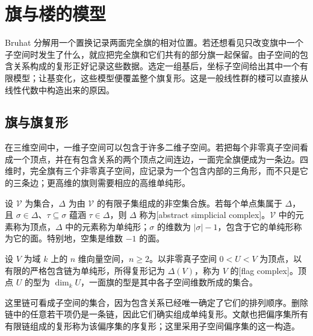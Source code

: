 
\section{旗与楼的模型}
\label{b5:sec:F03}

Bruhat 分解用一个置换记录两面完全旗的相对位置。若还想看见只改变旗中一个子空间时发生了什么，就应把完全旗和它们共有的部分旗一起保留。由子空间的包含关系构成的复形正好记录这些数据。选定一组基后，坐标子空间给出其中一个有限模型；让基变化，这些模型便覆盖整个旗复形。这是一般线性群的楼可以直接从线性代数中构造出来的原因。

\subsection{旗与旗复形}
\label{b5:subsec:F03:01}

在三维空间中，一维子空间可以包含于许多二维子空间。若把每个非零真子空间看成一个顶点，并在有包含关系的两个顶点之间连边，一面完全旗便成为一条边。四维时，完全旗有三个非零真子空间，应记录为一个包含内部的三角形，而不只是它的三条边；更高维的旗则需要相应的高维单纯形。

\begin{definition}\label{b5:def:F-flag-complex}
	设 \(\mathcal V\) 为集合，\(\Delta\) 为由 \(\mathcal V\) 的有限子集组成的非空集合族。若每个单点集属于 \(\Delta\)，且 \(\sigma\in\Delta\)、\(\tau\subseteq\sigma\) 蕴涵 \(\tau\in\Delta\)，则 \(\Delta\) 称为[abstract simplicial complex]。\(\mathcal V\) 中的元素称为顶点，\(\Delta\) 中的元素称为单纯形；\(\sigma\) 的维数为 \(\lvert\sigma\rvert-1\)，包含于它的单纯形称为它的面。特别地，空集是维数 \(-1\) 的面。

	设 \(V\) 为域 \(k\) 上的 \(n\) 维向量空间，\(n\ge2\)。以非零真子空间 \(0<U<V\) 为顶点，以有限的严格包含链为单纯形，所得复形记为 \(\Delta(V)\)，称为 \(V\) 的[flag complex]。顶点 \(U\) 的型为 \(\dim_kU\)，一面旗的型是其中各子空间维数所成的集合。
\end{definition}

这里链可看成子空间的集合，因为包含关系已经唯一确定了它们的排列顺序。删除链中的任意若干项仍是一条链，因此它们确实组成单纯复形。文献也把偏序集所有有限链组成的复形称为该偏序集的序复形；这里采用子空间偏序集的这一构造。

